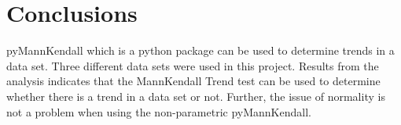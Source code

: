 \documentclass[12pt, letterpaper, twoside]{article}
\begin{document}
\section{Conclusions}
pyMannKendall which is a python package can be used to determine trends in a data set. Three different data sets were used in this project. Results from the analysis indicates that the MannKendall Trend test can be used to determine whether there is a trend in a data set or not. Further, the issue of normality is not a problem when using the non-parametric pyMannKendall. 
\end{document}
